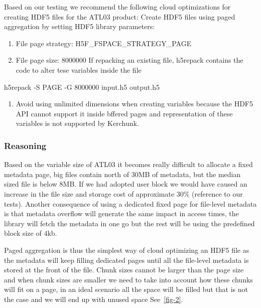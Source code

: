 \documentclass[
]{agujournal2019}
\newenvironment{Shaded}{\begin{snugshade}}{\end{snugshade}}
\newcommand{\AttributeTok}[1]{\textcolor[rgb]{0.40,0.45,0.13}{#1}}
\newcommand{\ExtensionTok}[1]{\textcolor[rgb]{0.00,0.23,0.31}{#1}}
\newcommand{\NormalTok}[1]{\textcolor[rgb]{0.00,0.23,0.31}{#1}}
\providecommand{\tightlist}{%
  \setlength{\itemsep}{0pt}\setlength{\parskip}{0pt}}\usepackage{longtable,booktabs,array}
\begin{document}
Based on our testing we recommend the following cloud optimizations for
creating HDF5 files for the ATL03 product: Create HDF5 files using paged
aggregation by setting HDF5 library parameters:

\begin{enumerate}
\def\labelenumi{\arabic{enumi}.}
\tightlist
\item
  File page strategy: H5F\_FSPACE\_STRATEGY\_PAGE
\item
  File page size: 8000000 If repacking an existing file, h5repack
  contains the code to alter tese variables inside the file
\end{enumerate}

\begin{Shaded}
\begin{Highlighting}[]
 \ExtensionTok{h5repack} \AttributeTok{{-}S}\NormalTok{ PAGE }\AttributeTok{{-}G}\NormalTok{ 8000000 input.h5 output.h5}
\end{Highlighting}
\end{Shaded}

\begin{enumerate}
\def\labelenumi{\arabic{enumi}.}
\setcounter{enumi}{2}
\tightlist
\item
  Avoid using unlimited dimensions when creating variables because the
  HDF5 API cannot support it inside bffered pages and representation of
  these variables is not supported by Kerchunk.
\end{enumerate}

\subsubsection{Reasoning}\label{reasoning}

Based on the variable size of ATL03 it becomes really difficult to
allocate a fixed metadata page, big files contain north of 30MB of
metadata, but the median sized file is below 8MB. If we had adopted user
block we would have caused an increase in the file size and storage cost
of approximate 30\% (reference to our tests). Another consequence of
using a dedicated fixed page for file-level metadata is that metadata
overflow will generate the same impact in access times, the library will
fetch the metadata in one go but the rest will be using the predefined
block size of 4kb.

Paged aggregation is thus the simplest way of cloud optimizing an HDF5
file as the metadata will keep filling dedicated pages until all the
file-level metadata is stored at the front of the file. Chunk sizes
cannot be larger than the page size and when chunk sizes are smaller we
need to take into account how these chunks will fit on a page, in an
ideal scenario all the space will be filled but that is not the case and
we will end up with unused space See~\ref{fig-2}.
\end{document}
